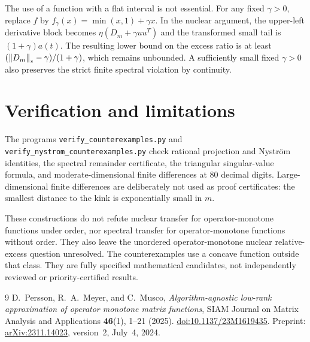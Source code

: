 \documentclass[11pt]{article}
\begin{document}
The use of a function with a flat interval is not essential. For any fixed $\gamma>0$, replace $f$ by $f_\gamma(x)=\min(x,1)+\gamma x$. In the nuclear argument, the upper-left derivative block becomes $\eta(D_m+\gamma uu^T)$ and the transformed small tail is $(1+\gamma)a(t)$. The resulting lower bound on the excess ratio is at least $(\left\lVert D_m\right\rVert_*-\gamma)/(1+\gamma)$, which remains unbounded. A sufficiently small fixed $\gamma>0$ also preserves the strict finite spectral violation by continuity.

\section{Verification and limitations}
The programs \texttt{verify\_counterexamples.py} and
\texttt{verify\_nystrom\_counterexamples.py} check rational projection and Nystr\"om identities, the spectral remainder certificate, the triangular singular-value formula, and moderate-dimensional finite differences at 80 decimal digits. Large-dimensional finite differences are deliberately not used as proof certificates: the smallest distance to the kink is exponentially small in $m$.

These constructions do not refute nuclear transfer for operator-monotone functions under order, nor spectral transfer for operator-monotone functions without order. They also leave the unordered operator-monotone nuclear relative-excess question unresolved. The counterexamples use a concave function outside that class. They are fully specified mathematical candidates, not independently reviewed or priority-certified results.

\begin{thebibliography}{9}
D.~Persson, R.~A.~Meyer, and C.~Musco,
\emph{Algorithm-agnostic low-rank approximation of operator monotone matrix functions},
SIAM Journal on Matrix Analysis and Applications \textbf{46}(1), 1--21 (2025).
\href{https://doi.org/10.1137/23M1619435}{doi:10.1137/23M1619435}.
Preprint: \href{https://arxiv.org/abs/2311.14023}{arXiv:2311.14023}, version~2, July~4, 2024.
\end{thebibliography}
\end{document}
